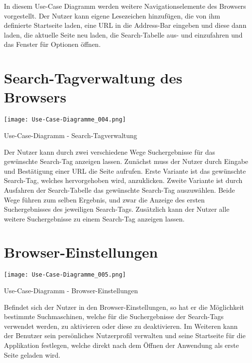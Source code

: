 In diesem Use-Case Diagramm werden weitere Navigationselemente des Browsers vorgestellt. Der Nutzer kann eigene Lesezeichen hinzufügen, die von ihm definierte Startseite laden, eine URL in die Address-Bar eingeben und diese dann laden, die aktuelle Seite neu laden, die Search-Tabelle aus- und einzufahren und das Fenster für Optionen öffnen.

\section{Search-Tagverwaltung des Browsers}

\texttt{[image: Use-Case-Diagramme\_004.png]}
	\caption{Use-Case-Diagramm - Search-Tagverwaltung}
	\label{fig:Search-Tagverwaltung}

Der Nutzer kann durch zwei verschiedene Wege Suchergebnisse für das gewünschte Search-Tag anzeigen lassen. Zunächst muss der Nutzer durch Eingabe und Bestätigung einer URL die Seite aufrufen. Erste Variante ist das gewünschte Search-Tag, welches hervorgehoben wird, anzuklicken. Zweite Variante ist durch Ausfahren der Search-Tabelle das gewünschte Search-Tag auszuwählen. Beide Wege führen zum selben Ergebnis, und zwar die Anzeige des ersten Suchergebnisses des jeweiligen Search-Tags. Zusätzlich kann der Nutzer alle weitere Suchergebnisse zu einem Search-Tag anzeigen lassen.

\section{Browser-Einstellungen}

\texttt{[image: Use-Case-Diagramme\_005.png]}
	\caption{Use-Case-Diagramm - Browser-Einstellungen}
	\label{fig:Browser-Einstellungen}

Befindet sich der Nutzer in den Browser-Einstellungen, so hat er die Möglichkeit bestimmte Suchmaschinen, welche für die Suchergebnisse der Search-Tags verwendet werden, zu aktivieren oder diese zu deaktivieren. Im Weiteren kann der Benutzer sein persönliches Nutzerprofil verwalten und seine Startseite für die Applikation festlegen, welche direkt nach dem Öffnen der Anwendung als erste Seite geladen wird.
